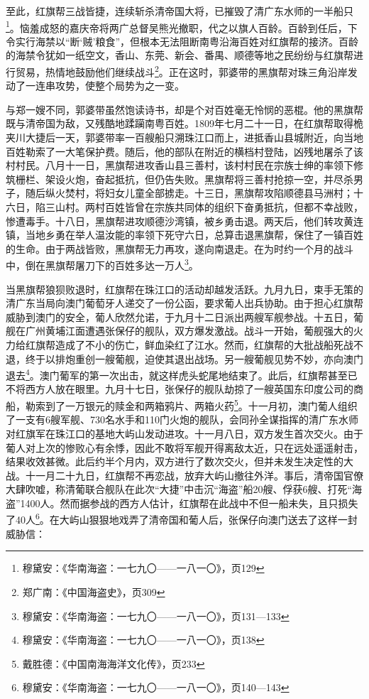 至此，红旗帮三战皆捷，连续斩杀清帝国大将，已摧毁了清广东水师的一半船只\footnote{穆黛安：《华南海盗：一七九〇——一八一〇》，页129}。恼羞成怒的嘉庆帝将两广总督吴熊光撤职，代之以旗人百龄。百龄到任后，下令实行海禁以“断‘贼’粮食”，但根本无法阻断南粤沿海百姓对红旗帮的接济。百龄的海禁令犹如一纸空文，香山、东莞、新会、番禺、顺德等地之民纷纷与红旗帮进行贸易，热情地鼓励他们继续战斗\footnote{郑广南：《中国海盗史》，页309}。正在这时，郭婆带的黑旗帮对珠三角沿岸发动了一连串攻势，使整个局势为之一变。

与郑一嫂不同，郭婆带虽然饱读诗书，却是个对百姓毫无怜悯的恶棍。他的黑旗帮既与清帝国为敌，又残酷地蹂躏南粤百姓。1809年七月二十一日，在红旗帮取得桅夹川大捷后一天，郭婆带率一百艘船只溯珠江口而上，进抵香山县城附近，向当地百姓勒索了一大笔保护费。随后，他的部队在附近的横档村登陆，凶残地屠杀了该村村民。八月十一日，黑旗帮进攻香山县三善村，该村村民在宗族士绅的率领下修筑栅栏、架设火炮，奋起抵抗，但仍告失败。黑旗帮将三善村抢掠一空，并尽杀男子，随后纵火焚村，将妇女儿童全部掳走。十三日，黑旗帮攻陷顺德县马洲村；十六日，陷三山村。两村百姓皆曾在宗族共同体的组织下奋勇抵抗，但都不幸战败，惨遭毒手。十八日，黑旗帮进攻顺德沙湾镇，被乡勇击退。两天后，他们转攻黄连镇，当地乡勇在举人温汝能的率领下死守六日，总算击退黑旗帮，保住了一镇百姓的生命。由于两战皆败，黑旗帮无力再攻，遂向南退走。在为时约一个月的战斗中，倒在黑旗帮屠刀下的百姓多达一万人\footnote{穆黛安：《华南海盗：一七九〇——一八一〇》，页131—133}。

当黑旗帮狼狈败退时，红旗帮在珠江口的活动却越发活跃。九月九日，束手无策的清广东当局向澳门葡萄牙人递交了一份公函，要求葡人出兵协助。由于担心红旗帮威胁到澳门的安全，葡人欣然允诺，于九月十二日派出两艘军舰参战。十五日，葡舰在广州黄埔江面遭遇张保仔的舰队，双方爆发激战。战斗一开始，葡舰强大的火力给红旗帮造成了不小的伤亡，鲜血染红了江水。然而，红旗帮的大批战船死战不退，终于以排炮重创一艘葡舰，迫使其退出战场。另一艘葡舰见势不妙，亦向澳门退去\footnote{穆黛安：《华南海盗：一七九〇——一八一〇》，页138}。澳门葡军的第一次出击，就这样虎头蛇尾地结束了。此后，红旗帮甚至已不将西方人放在眼里。九月十七日，张保仔的舰队劫掠了一艘英国东印度公司的商船，勒索到了一万银元的赎金和两箱鸦片、两箱火药\footnote{戴胜德：《中国南海海洋文化传》，页233}。十一月初，澳门葡人组织了一支有6艘军舰、730名水手和110门火炮的舰队，会同孙全谋指挥的清广东水师对红旗军在珠江口的基地大屿山发动进攻。十一月八日，双方发生首次交火。由于葡人对上次的惨败心有余悸，因此不敢将军舰开得离敌太近，只在远处遥遥射击，结果收效甚微。此后约半个月内，双方进行了数次交火，但并未发生决定性的大战。十一月二十九日，红旗帮不再恋战，放弃大屿山撤往外洋。事后，清帝国官僚大肆吹嘘，称清葡联合舰队在此次“大捷”中击沉“海盗”船20艘、俘获6艘、打死“海盗”1400人。然而据参战的西方人估计，红旗帮在此战中不但一船未失，且只损失了40人\footnote{穆黛安：《华南海盗：一七九〇——一八一〇》，页140—143}。在大屿山狠狠地戏弄了清帝国和葡人后，张保仔向澳门送去了这样一封威胁信：

